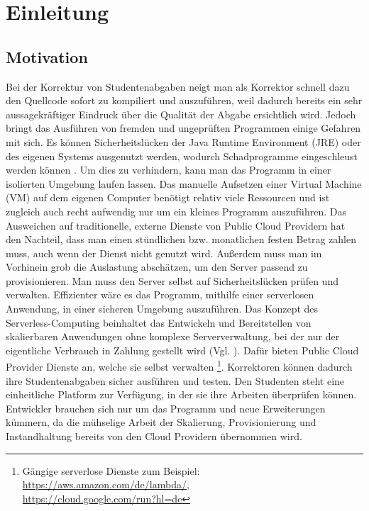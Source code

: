 \chapter{Einleitung}

\section{Motivation}

Bei der Korrektur von Studentenabgaben neigt man als Korrektor schnell dazu den Quellcode
sofort zu kompiliert und auszuführen, weil dadurch bereits ein sehr aussagekräftiger Eindruck
über die Qualität der Abgabe ersichtlich wird. Jedoch bringt das Ausführen von fremden und ungeprüften Programmen einige Gefahren mit sich.
Es können Sicherheitslücken der Java Runtime Environment (JRE) \cite{Jre}
oder des eigenen Systems ausgenutzt werden, wodurch Schadprogramme eingeschleust
werden können \cite{CveJreVuln}.
Um dies zu verhindern, kann man das Programm in einer isolierten Umgebung laufen lassen.
Das manuelle Aufsetzen einer Virtual Machine (VM) auf dem eigenen Computer benötigt relativ
viele Ressourcen und ist zugleich auch recht aufwendig nur um ein kleines Programm auszuführen.
Das Ausweichen auf traditionelle, externe Dienste von Public Cloud Providern hat den Nachteil,
dass man einen stündlichen bzw. monatlichen festen Betrag zahlen muss,
auch wenn der Dienst nicht genutzt wird. Außerdem muss man im Vorhinein grob die Auslastung
abschätzen, um den Server passend zu provisionieren.
Man muss den Server selbst auf Sicherheitslücken prüfen und verwalten.
Effizienter wäre es das Programm, mithilfe einer serverlosen Anwendung, in einer sicheren Umgebung auszuführen.
Das Konzept des Serverless-Computing beinhaltet das Entwickeln und Bereitstellen
von skalierbaren Anwendungen ohne komplexe Serververwaltung, bei der nur der eigentliche Verbrauch
in Zahlung gestellt wird (Vgl. \cite{CioGov}).
Dafür bieten Public Cloud Provider Dienste an, welche sie selbst verwalten
\footnote{
  Gängige serverlose Dienste zum Beispiel: {\url{https://aws.amazon.com/de/lambda/}},\\{\url{https://cloud.google.com/run?hl=de}}
}.
Korrektoren können dadurch ihre Studentenabgaben sicher ausführen und testen.
Den Studenten steht eine einheitliche Platform zur Verfügung, in der sie ihre Arbeiten überprüfen können.
Entwickler brauchen sich nur um das Programm und neue Erweiterungen kümmern, da die mühselige Arbeit
der Skalierung, Provisionierung und Instandhaltung bereits von den Cloud Providern übernommen wird.

